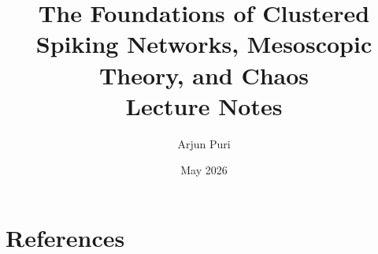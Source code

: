 \documentclass[11pt,oneside]{book}
\title{The Foundations of Clustered Spiking Networks, Mesoscopic Theory, and Chaos\\Lecture Notes}
\author{Arjun Puri}
\date{May 2026}
\begin{document}
\frontmatter
\maketitle
\tableofcontents




\mainmatter











\appendix



\backmatter
\chapter{References}
\nocite{amitBrunel1997global,engelEtAl2016selective,kadmonSompolinsky2015transition,mazzucatoFontaniniLaCamera2015cosyne,mazzucatoEtAl2015dynamics,mazzucatoEtAl2019expectation,recanatesiEtAl2020metastable,rostamiEtAl2020spiking,schueckerGoedekeHelias2018optimal,sompolinskyCrisantiSommers1988chaos,sternSompolinskyAbbott2014dynamics,brunel2000dynamics,vanVreeswijkSompolinsky1996chaos,vanVreeswijkSompolinsky1998chaotic,renartEtAl2010asynchronous,litwinKumarDoiron2012slow,schwalgerDegerGerstner2017towards,ostojic2014two,gerstnerEtAl2014neuronalDynamics,strogatz2015nonlinear,dayanAbbott2001theoretical}


\end{document}
